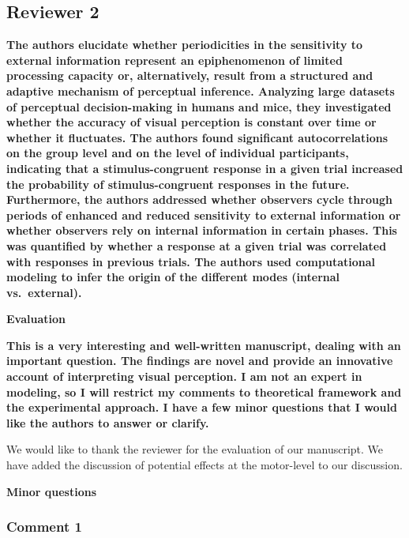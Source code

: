 \documentclass[
]{article}
\begin{document}
\hypertarget{reviewer-2}{%
\subsection{Reviewer 2}\label{reviewer-2}}

\textbf{The authors elucidate whether periodicities in the sensitivity
to external information represent an epiphenomenon of limited processing
capacity or, alternatively, result from a structured and adaptive
mechanism of perceptual inference. Analyzing large datasets of
perceptual decision-making in humans and mice, they investigated whether
the accuracy of visual perception is constant over time or whether it
fluctuates. The authors found significant autocorrelations on the group
level and on the level of individual participants, indicating that a
stimulus-congruent response in a given trial increased the probability
of stimulus-congruent responses in the future. Furthermore, the authors
addressed whether observers cycle through periods of enhanced and
reduced sensitivity to external information or whether observers rely on
internal information in certain phases. This was quantified by whether a
response at a given trial was correlated with responses in previous
trials. The authors used computational modeling to infer the origin of
the different modes (internal vs.~external).}

\textbf{Evaluation}

\textbf{This is a very interesting and well-written manuscript, dealing
with an important question. The findings are novel and provide an
innovative account of interpreting visual perception. I am not an expert
in modeling, so I will restrict my comments to theoretical framework and
the experimental approach. I have a few minor questions that I would
like the authors to answer or clarify.}

We would like to thank the reviewer for the evaluation of our
manuscript. We have added the discussion of potential effects at the
motor-level to our discussion.

\textbf{Minor questions}

\hypertarget{comment-1-1}{%
\subsubsection{Comment 1}\label{comment-1-1}}
\end{document}
